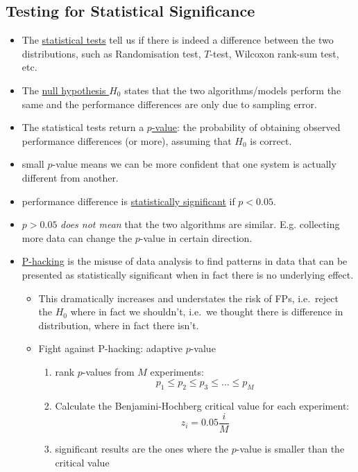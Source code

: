 \documentclass[twocolumn,landscape,10pt]{article}
\theoremstyle{definition}
\begin{document}
\subsection{Testing for Statistical Significance}

\begin{itemize}
    \item The \underline{statistical tests} tell us if there is indeed a
        difference between the two distributions, such as Randomisation test,
        $T$-test, Wilcoxon rank-sum test, etc.
    \item The \underline{null hypothesis $H_0$} states that the two algorithms/models
        perform the same and the performance differences are only due to
        sampling error.
    \item The statistical tests return a \underline{$p$-value}: the probability
        of obtaining observed performance differences (or more), assuming that
        $H_0$ is correct.
    \item small $p$-value means we can be more confident that one system is
        actually different from another.
    \item performance difference is \underline{statistically significant} if
        $p<0.05$.
    \item $p>0.05$ \emph{does not mean} that the two algorithms are similar.
        E.g. collecting more data can change the $p$-value in certain direction.
    \item \underline{P-hacking} is the misuse of data analysis to find
        patterns in data that can be presented as statistically significant
        when in fact there is no underlying effect. 
    \begin{itemize}
        \item 
            This dramatically increases
            and understates the risk of FPs, i.e.\ reject the $H_0$ where in fact we
            shouldn't, i.e.\ we thought there is difference in distribution, where
            in fact there isn't.
        \item Fight against P-hacking: adaptive $p$-value
            \begin{enumerate}
                \item rank $p$-values from $M$ experiments:
                    \[
                        p_1\le p_2\le p_3\le\ldots\le p_M
                    \]
                \item Calculate the Benjamini-Hochberg critical value for each
                    experiment:
                    \[
                        z_i=0.05 \frac{i}{M}
                    \]
                \item significant results are the ones where the $p$-value is
                    smaller than the critical value
            \end{enumerate} 
    \end{itemize} 
\end{itemize} 
\end{document}
